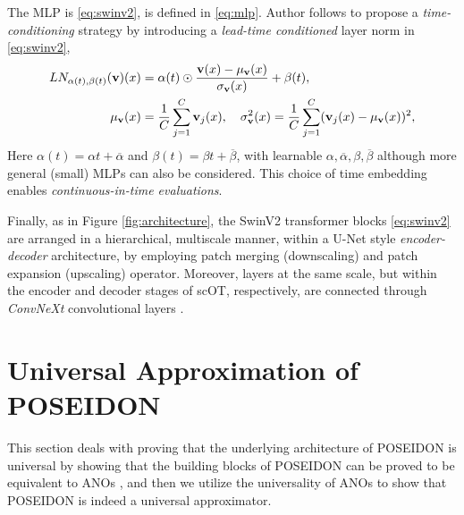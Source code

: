 \documentclass[reqno,10pt]{amsart}
\theoremstyle{plain}
\theoremstyle{definition}
\begin{document}
\noindent The MLP is \ref{eq:swinv2}, is defined in \ref{eq:mlp}. Author follows \cite{EP2017} to propose a {\it time-conditioning} strategy by introducing a {\it lead-time conditioned} layer norm in \ref{eq:swinv2},
\begin{equation} \label{eq:LN}
    \begin{aligned}
        LN_{\alpha(t),\beta(t)}({\bf v})(x) &= \alpha(t) \odot \frac{{\bf v}(x) - \mu_{{\bf v}}(x)}{\sigma_{\bf v}(x)} + \beta(t), \\
        \mu_{{\bf v}}(x) &= \frac{1}{C}\sum_{j=1}^{C} {\bf v}_j(x), \quad \sigma_{{\bf v}}^2(x) = \frac{1}{C} \sum_{j=1}^{C} ({\bf v}_j(x) - \mu_{{\bf v}}(x))^2,
    \end{aligned}
\end{equation}
Here $\alpha(t) = \alpha t + \overline{\alpha}$ and $\beta(t) = \beta t + \overline{\beta}$, with learnable $\alpha, \overline{\alpha}, \beta, \overline{\beta}$ although more general (small) MLPs can also be considered. This choice of time embedding enables {\it continuous-in-time evaluations}.

Finally, as in Figure \ref{fig:architecture}, the SwinV2 transformer blocks \ref{eq:swinv2} are arranged in a hierarchical, multiscale manner, within a U-Net style {\it encoder-decoder} architecture, by employing patch merging (downscaling) and patch expansion (upscaling) operator. Moreover, layers at the same scale, but within the encoder and decoder stages of scOT, respectively, are connected through {\it ConvNeXt} convolutional layers \cite{ZLiu2022}.

\section{\bf Universal Approximation of POSEIDON}
\noindent This section deals with proving that the underlying architecture of POSEIDON is universal by showing that the building blocks of POSEIDON can be proved to be equivalent to ANOs \cite{SL2024}, and then we utilize the universality of ANOs to show that POSEIDON is indeed a universal approximator.
\end{document}
